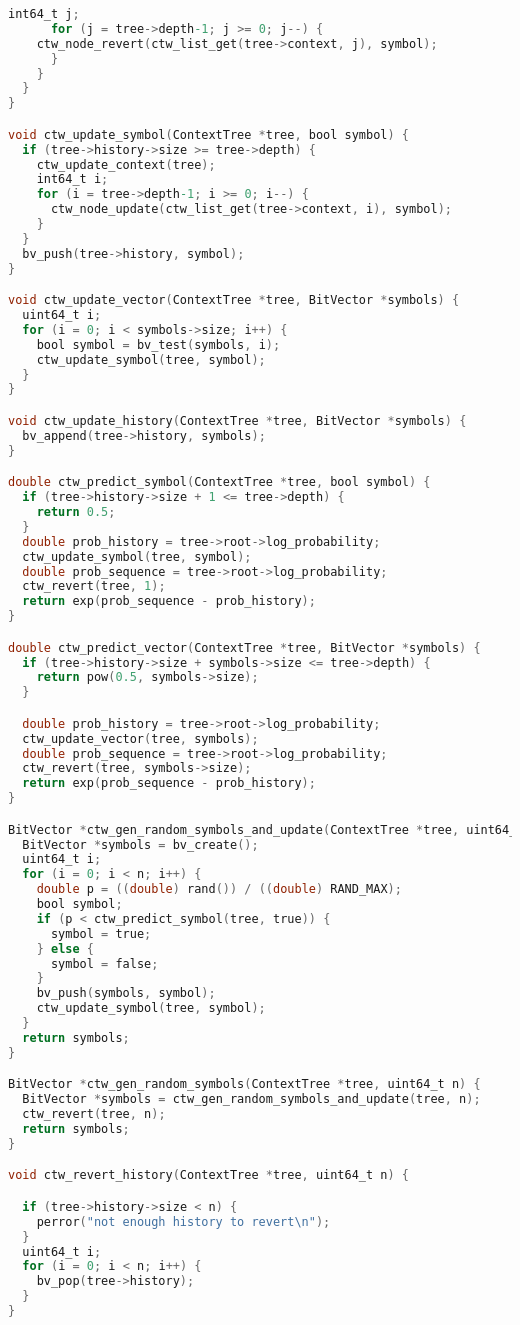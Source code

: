 \documentclass[fancychapters]{report}   	%
\begin{document}
\begin{lstlisting}[language=C,caption={context_tree.c}]
      int64_t j;
      for (j = tree->depth-1; j >= 0; j--) {
	ctw_node_revert(ctw_list_get(tree->context, j), symbol);
      }
    }
  }
}

void ctw_update_symbol(ContextTree *tree, bool symbol) {
  if (tree->history->size >= tree->depth) {
    ctw_update_context(tree);
    int64_t i;
    for (i = tree->depth-1; i >= 0; i--) {
      ctw_node_update(ctw_list_get(tree->context, i), symbol);
    }
  }
  bv_push(tree->history, symbol);
}

void ctw_update_vector(ContextTree *tree, BitVector *symbols) {
  uint64_t i;
  for (i = 0; i < symbols->size; i++) {
    bool symbol = bv_test(symbols, i);
    ctw_update_symbol(tree, symbol);
  }
}

void ctw_update_history(ContextTree *tree, BitVector *symbols) {
  bv_append(tree->history, symbols);
}

double ctw_predict_symbol(ContextTree *tree, bool symbol) {
  if (tree->history->size + 1 <= tree->depth) {
    return 0.5;
  }
  double prob_history = tree->root->log_probability;
  ctw_update_symbol(tree, symbol);
  double prob_sequence = tree->root->log_probability;
  ctw_revert(tree, 1);
  return exp(prob_sequence - prob_history);
}

double ctw_predict_vector(ContextTree *tree, BitVector *symbols) {
  if (tree->history->size + symbols->size <= tree->depth) {
    return pow(0.5, symbols->size);
  }

  double prob_history = tree->root->log_probability;
  ctw_update_vector(tree, symbols);
  double prob_sequence = tree->root->log_probability;
  ctw_revert(tree, symbols->size);
  return exp(prob_sequence - prob_history);
}

BitVector *ctw_gen_random_symbols_and_update(ContextTree *tree, uint64_t n) {
  BitVector *symbols = bv_create();
  uint64_t i;
  for (i = 0; i < n; i++) {
    double p = ((double) rand()) / ((double) RAND_MAX);
    bool symbol;
    if (p < ctw_predict_symbol(tree, true)) {
      symbol = true;
    } else {
      symbol = false;
    }
    bv_push(symbols, symbol);
    ctw_update_symbol(tree, symbol);
  }
  return symbols;
}

BitVector *ctw_gen_random_symbols(ContextTree *tree, uint64_t n) {
  BitVector *symbols = ctw_gen_random_symbols_and_update(tree, n);
  ctw_revert(tree, n);
  return symbols;
}

void ctw_revert_history(ContextTree *tree, uint64_t n) {

  if (tree->history->size < n) {
    perror("not enough history to revert\n");
  }
  uint64_t i;
  for (i = 0; i < n; i++) {
    bv_pop(tree->history);
  }
}


\end{lstlisting}
\end{document}
